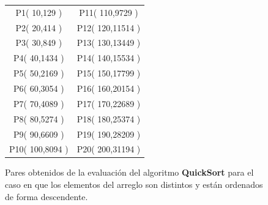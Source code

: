         \begin{figure}[h!]
            \centering
            \begin{tabular}{c|c}
                    P1( 10,129 ) & P11( 110,9729 )\\
                    P2( 20,414 ) & P12( 120,11514 )\\
                    P3( 30,849 ) & P13( 130,13449 )\\
                    P4( 40,1434 ) & P14( 140,15534 )\\
                    P5( 50,2169 ) & P15( 150,17799 )\\
                    P6( 60,3054 ) & P16( 160,20154 )\\
                    P7( 70,4089 ) & P17( 170,22689 )\\
                    P8( 80,5274 ) & P18( 180,25374 )\\
                    P9( 90,6609 ) & P19( 190,28209 )\\
                    P10( 100,8094 ) & P20( 200,31194 )\\
            \end{tabular}
            \caption{Pares obtenidos de la evaluación del algoritmo \textbf{QuickSort} para el caso en que los elementos del arreglo son distintos y están ordenados de forma descendente.}
            \label{PuntosQSort}
        \end{figure}
        
